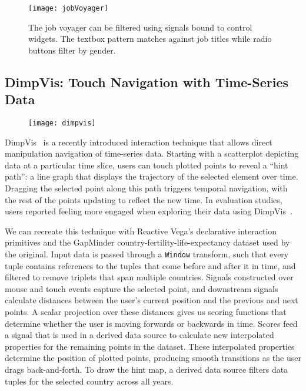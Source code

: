 \begin{figure}[h!]
  \centering
  \texttt{[image: jobVoyager]}
  \caption{The job voyager can be filtered using signals bound to control
  widgets. The textbox pattern matches against job titles while radio buttons
  filter by gender.}
  \label{fig:vg:jobVoyager}
\end{figure}

\subsection{DimpVis: Touch Navigation with Time-Series Data}

\begin{figure}[h!]
  \centering
  \texttt{[image: dimpvis]}
\end{figure}

DimpVis~\cite{kondo:dimpvis} is a recently introduced interaction technique that
allows direct manipulation navigation of time-series data. Starting with a
scatterplot depicting data at a particular time slice, users can touch plotted
points to reveal a ``hint path'': a line graph that displays the trajectory of
the selected element over time. Dragging the selected point along this path
triggers temporal navigation, with the rest of the points updating to reflect
the new time. In evaluation studies, users reported feeling more engaged when
exploring their data using DimpVis~\cite{kondo:dimpvis}.

We can recreate this technique with Reactive Vega's declarative interaction
primitives and the GapMinder country-fertility-life-expectancy dataset used by
the original. Input data is passed through a \texttt{Window} transform, such
that every tuple contains references to the tuples that come before and after it
in time, and filtered to remove triplets that span multiple countries. Signals
constructed over mouse and touch events capture the selected point, and
downstream signals calculate distances between the user's current position and
the previous and next points. A scalar projection over these distances gives us
scoring functions that determine whether the user is moving forwards or
backwards in time. Scores feed a signal that is used in a derived data source to
calculate new interpolated properties for the remaining points in the dataset.
These interpolated properties determine the position of plotted points,
producing smooth transitions as the user drags back-and-forth. To draw the hint
map, a derived data source filters data tuples for the selected country across
all years.

